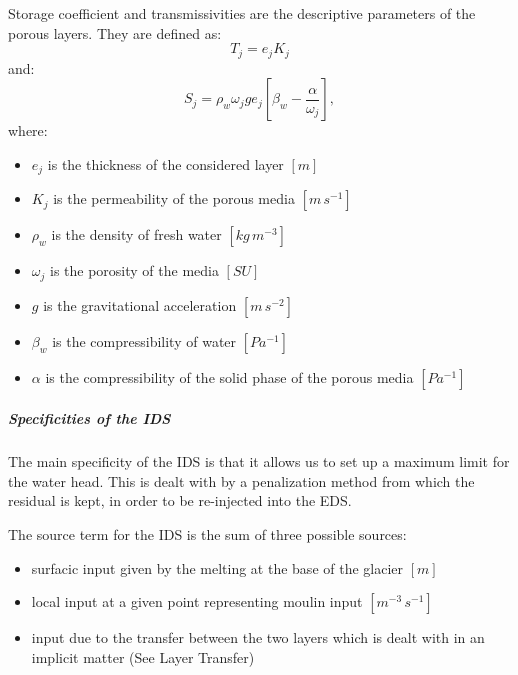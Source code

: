 Storage coefficient and transmissivities are the descriptive parameters of the porous layers. They are defined as:
\begin{equation}
	T_j = e_j K_j
\end{equation}
and:
\begin{equation}
	S_j = \rho_{w} \omega_j g e_j\left[ \beta_{w} - \frac{\alpha}{\omega_j}\right],
\end{equation}
where:
\begin{itemize}
	\item $e_j$ is the thickness of the considered layer $[m]$
	\item $K_j$ is the permeability of the porous media $[m\,s^{-1}]$
	\item $\rho_w$ is the density of fresh water $[kg\,m^{-3}]$
	\item $\omega_j$ is the porosity of the media $[SU]$
	\item $g$ is the gravitational acceleration $[m\,s^{-2}]$
	\item $\beta_w$ is the compressibility of water $[Pa^{-1}]$
	\item $\alpha$ is the compressibility of the solid phase of the porous media $[Pa^{-1}]$
\end{itemize}

\subparagraph{Specificities of the IDS}
The main specificity of the IDS is that it allows us to set up a maximum limit for the water head. This is dealt with by a penalization method from which the residual is kept, in order to be re-injected into the EDS.

The source term for the IDS is the sum of three possible sources:
\begin{itemize}
	\item surfacic input given by the melting at the base of the glacier $[m]$
	\item local input at a given point representing moulin input $[m^{-3}\,s^{-1}]$
	\item input due to the transfer between the two layers which is dealt with in an implicit matter (See Layer Transfer)
\end{itemize}

